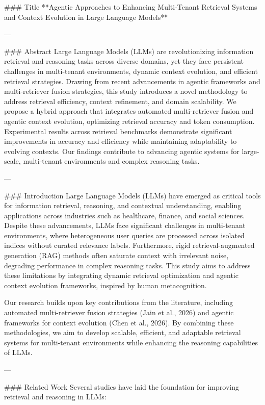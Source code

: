 ### Title  
**Agentic Approaches to Enhancing Multi-Tenant Retrieval Systems and Context Evolution in Large Language Models**

---

### Abstract  
Large Language Models (LLMs) are revolutionizing information retrieval and reasoning tasks across diverse domains, yet they face persistent challenges in multi-tenant environments, dynamic context evolution, and efficient retrieval strategies. Drawing from recent advancements in agentic frameworks and multi-retriever fusion strategies, this study introduces a novel methodology to address retrieval efficiency, context refinement, and domain scalability. We propose a hybrid approach that integrates automated multi-retriever fusion and agentic context evolution, optimizing retrieval accuracy and token consumption. Experimental results across retrieval benchmarks demonstrate significant improvements in accuracy and efficiency while maintaining adaptability to evolving contexts. Our findings contribute to advancing agentic systems for large-scale, multi-tenant environments and complex reasoning tasks.

---

### Introduction  
Large Language Models (LLMs) have emerged as critical tools for information retrieval, reasoning, and contextual understanding, enabling applications across industries such as healthcare, finance, and social sciences. Despite these advancements, LLMs face significant challenges in multi-tenant environments, where heterogeneous user queries are processed across isolated indices without curated relevance labels. Furthermore, rigid retrieval-augmented generation (RAG) methods often saturate context with irrelevant noise, degrading performance in complex reasoning tasks. This study aims to address these limitations by integrating dynamic retrieval optimization and agentic context evolution frameworks, inspired by human metacognition.

Our research builds upon key contributions from the literature, including automated multi-retriever fusion strategies (Jain et al., 2026) and agentic frameworks for context evolution (Chen et al., 2026). By combining these methodologies, we aim to develop scalable, efficient, and adaptable retrieval systems for multi-tenant environments while enhancing the reasoning capabilities of LLMs.

---

### Related Work  
Several studies have laid the foundation for improving retrieval and reasoning in LLMs:

